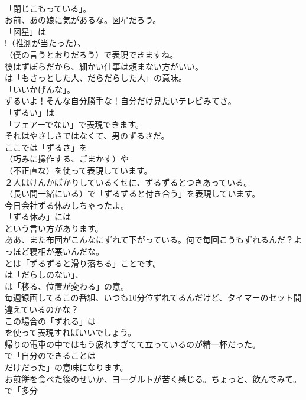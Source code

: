 \documentclass[8pt]{extreport}
\begin{document}
\begin{CJK}{UTF8}{min}
\\	「閉じこもっている」。	
\\	お前、あの娘に気があるな。図星だろう。 
\\	「図星」は
\\	!（推測が当たった）、
\\	（僕の言うとおりだろう）で表現できますね。	
\\	彼はずぼらだから、細かい仕事は頼まない方がいい。 
\\	は「もさっとした人、だらだらした人」の意味。
\\	「いいかげんな」。	
\\	ずるいよ！そんな自分勝手な！自分だけ見たいテレビみてさ。 
\\	「ずるい」は
\\	「フェアーでない」で表現できます。	
\\	それはやさしさではなくて、男のずるさだ。 
\\	ここでは「ずるさ」を
\\	（巧みに操作する、ごまかす）や
\\	（不正直な）を使って表現しています。	
\\	２人はけんかばかりしているくせに、ずるずるとつきあっている。 
\\	（長い間一緒にいる）で「ずるずると付き合う」を表現しています。	
\\	今日会社ずる休みしちゃったよ。 
\\	「ずる休み」には
\\	という言い方があります。	
\\	ああ、また布団がこんなにずれて下がっている。何で毎回こうもずれるんだ？よっぽど寝相が悪いんだな。 
\\	とは「ずるずると滑り落ちる」ことです。
\\	は「だらしのない」、
\\	は「移る、位置が変わる」の意。	
\\	毎週録画してるこの番組、いつも10分位ずれてるんだけど、タイマーのセット間違えているのかな？ 
\\	この場合の「ずれる」は 
\\	を使って表現すればいいでしょう。	
\\	帰りの電車の中ではもう疲れすぎてて立っているのが精一杯だった。 
\\	で「自分のできることは 
\\	だけだった」の意味になります。	
\\	お煎餅を食べた後のせいか、ヨーグルトが苦く感じる。ちょっと、飲んでみて。 
\\	で「多分 

\end{CJK}
\end{document}

